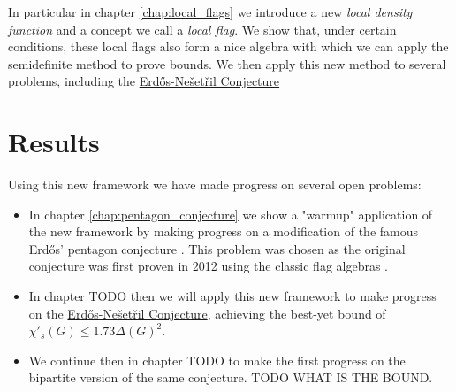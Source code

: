 In particular in chapter \ref{chap:local_flags} we introduce a
new \textit{local density function} and a concept we call a \textit{local flag}.
We show that, under certain conditions, these local flags also form a nice algebra
with which we can apply the semidefinite method to prove bounds. We then apply this new
method to several problems, including the 
\hyperref[conj:intro_erdos_nesetril]{Erd\H{o}s-Nešetřil Conjecture}

\section*{Results}

Using this new framework we have made progress on several open problems:
\begin{itemize}
    \item In chapter \ref{chap:pentagon_conjecture} we show a "warmup" application of the new framework by making progress on
        a modification of the famous Erd\H{o}s' pentagon conjecture \cite{erdos_pentagon_1984}.
        This problem was chosen as the original conjecture was first proven in 2012 using
        the classic flag algebras \cite{grzesikMaximumNumberFivecycles2012}.
    \item In chapter TODO then we will apply this new framework to make progress on the
        \hyperref[conj:intro_erdos_nesetril]{Erd\H{o}s-Nešetřil Conjecture}, achieving the best-yet
        bound of $\chi'_s(G) \leq 1.73\Delta(G)^2$.
    \item We continue then in chapter TODO to make the first progress on the bipartite version of
        the same conjecture. TODO WHAT IS THE BOUND.
\end{itemize}
